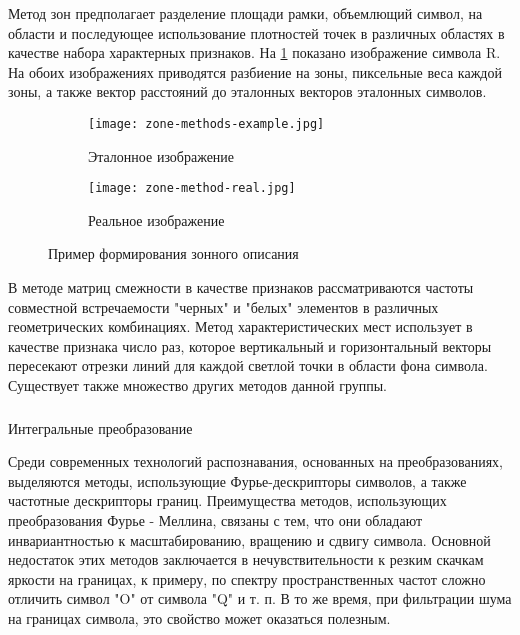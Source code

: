 Метод зон предполагает разделение площади рамки, объемлющий символ, на области и последующее использование плотностей точек в различных областях в качестве набора характерных признаков. На \ref{fig:domain:recognition:statistic_analisys:zones_description} показано изображение символа R. На обоих изображениях приводятся разбиение на зоны, пиксельные веса каждой зоны, а также вектор расстояний до эталонных векторов эталонных символов.

\begin{figure}[ht]
\centering
  \begin{subfigure}[b]{0.4\textwidth} 
    \centering
    \texttt{[image: zone-methods-example.jpg]}  
    \caption{Эталонное изображение}
  \end{subfigure}
  \begin{subfigure}[b]{0.4\textwidth} 
    \centering
    \texttt{[image: zone-method-real.jpg]}  
    \caption{Реальное изображение}
  \end{subfigure}
  \caption{Пример формирования зонного описания}
  \label{fig:domain:recognition:statistic_analisys:zones_description}
\end{figure}

В методе матриц смежности в качестве признаков рассматриваются частоты совместной встречаемости "черных" и "белых" элементов в различных геометрических комбинациях. Метод характеристических мест использует в качестве признака число раз, которое вертикальный и горизонтальный векторы пересекают отрезки линий для каждой светлой точки в области фона символа.
Существует также множество других методов данной группы.


\subsubsection{}
\label{sub:domain:recognition:integral_transformation}
Интегральные преобразование

Среди современных технологий распознавания, основанных на преобразованиях, выделяются методы, использующие Фурье-дескрипторы символов, а также частотные дескрипторы границ.
Преимущества методов, использующих преобразования Фурье - Меллина, связаны с тем, что они обладают инвариантностью к масштабированию, вращению и сдвигу символа. Основной недостаток этих методов заключается в нечувствительности к резким скачкам яркости на границах, к примеру, по спектру пространственных частот сложно отличить символ "O" от символа "Q" и т. п. В то же время, при фильтрации шума на границах символа, это свойство может оказаться полезным.

